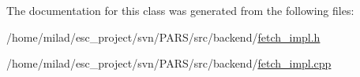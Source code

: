\begin{DoxyCode}
{}
\end{DoxyCode}


The documentation for this class was generated from the following files:\begin{DoxyCompactItemize}
\item 
/home/milad/esc\_\-project/svn/PARS/src/backend/\hyperlink{fetch__impl_8h}{fetch\_\-impl.h}\item 
/home/milad/esc\_\-project/svn/PARS/src/backend/\hyperlink{fetch__impl_8cpp}{fetch\_\-impl.cpp}\end{DoxyCompactItemize}
